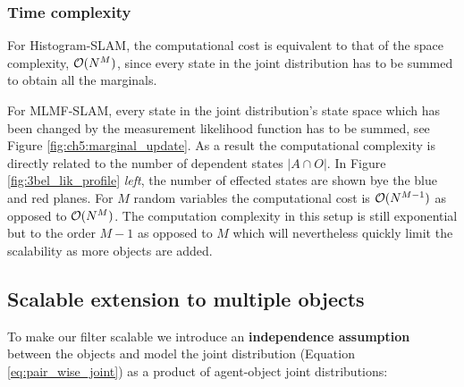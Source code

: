 \subsubsection{Time complexity}

For Histogram-SLAM, the computational cost is equivalent to that of the space complexity, $\operatorname{\mathcal{O}}(N^M)$,
since every state in the joint distribution has to be summed to obtain all the marginals.

For MLMF-SLAM, every state in the joint distribution's state space which has been changed by the measurement likelihood function 
has to be summed, see Figure \ref{fig:ch5:marginal_update}. As a result the computational complexity is directly related to the number 
of dependent states $|A \cap O|$. In Figure \ref{fig:3bel_lik_profile} \textit{left}, the number of effected states are shown bye the blue
and red planes.
For $M$ random variables the computational cost is $\operatorname{\mathcal{O}}(N^{M-1})$ as opposed to $\operatorname{\mathcal{O}}(N^M)$. 
The computation complexity in this setup is still exponential but to the order $M-1$ as opposed to $M$ which will nevertheless quickly limit 
the scalability as more objects are added. 


\subsection{Scalable extension to multiple objects}\label{subsec:scalabe_extension}

To make our filter scalable we introduce an \textbf{independence assumption} between the objects and model 
the joint distribution (Equation \ref{eq:pair_wise_joint}) as a product of agent-object joint distributions:

